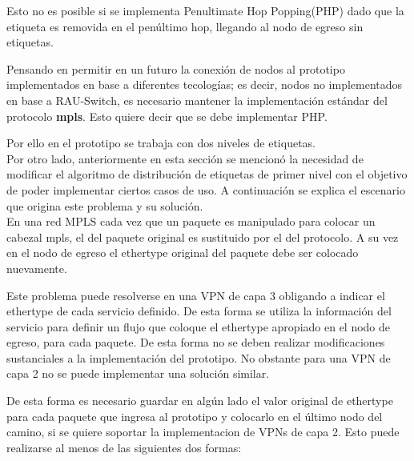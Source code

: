 Esto no es posible si se implementa Penultimate Hop Popping(PHP) dado que la etiqueta es removida en el pen\'ultimo hop, llegando al nodo de egreso sin etiquetas.

Pensando en permitir en un futuro la conexi\'on de nodos al prototipo implementados en base a diferentes tecolog\'ias; es decir, nodos no implementados en base a RAU-Switch, es necesario mantener la implementaci\'on estándar del protocolo \textbf{mpls}. Esto quiere decir que se debe implementar PHP.

Por ello en el prototipo se trabaja con dos niveles de etiquetas.\\

Por otro lado, anteriormente en esta secci\'on se mencion\'o la necesidad de modificar el algoritmo de distribución de etiquetas de primer nivel con el objetivo de poder implementar ciertos casos de uso. A continuaci\'on se explica el escenario que origina este problema y su soluci\'on.\\

En una red MPLS cada vez que un paquete es manipulado para colocar un cabezal mpls, el  del paquete original es sustituido por el del protocolo. A su vez en el nodo de egreso el ethertype original del paquete debe ser colocado nuevamente. 

Este problema puede resolverse en una VPN de capa 3 obligando a indicar el ethertype de cada servicio definido. De esta forma se utiliza la informaci\'on del servicio para definir un flujo que coloque el ethertype apropiado en el nodo de egreso, para cada paquete. De esta forma no se deben realizar modificaciones sustanciales a la implementaci\'on del prototipo. No obstante para una VPN de capa 2 no se puede implementar una soluci\'on similar.

De esta forma es necesario guardar en alg\'un lado el valor original de ethertype para cada paquete que ingresa al prototipo y colocarlo en el \'ultimo nodo del camino, si se quiere soportar la implementacion de VPNs de capa 2. Esto puede realizarse al menos de las siguientes dos formas:

